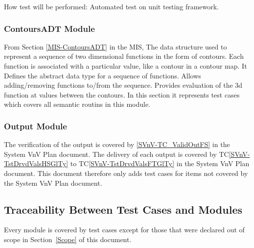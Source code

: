 \documentclass[12pt]{article}
\newcommand{\tcref}[1]{TC\ref{#1}}
\begin{document}
\begin{enumerate}[label=TC\arabic*:,ref={\arabic*}]
How test will be performed: Automated test on unit testing framework.

\subsubsection{ContoursADT Module}	
From Section \ref{MIS-ContoursADT} in the MIS, The data structure used to represent a
sequence of two dimensional functions in the form of contours. Each function
is associated with a particular value, like a contour in a contour map.
It Defines the abstract data type for a sequence of functions.
Allows adding/removing functions to/from the sequence.  Provides evaluation of
the 3d function at values between the contours. In this section it represents test cases which covers all semantic routins in this module.

\subsubsection{Output Module}	

The verification of the output is covered by \ref{SVnV-TC_ValidOutFS} in the 
System VnV Plan document. The delivery of each output is covered by 
\tcref{SVnV-TstDrvdValsHSGlTy} to \tcref{SVnV-TstDrvdValsFTGlTy} in the System VnV Plan 
document. This document therefore only adds test cases for items not covered by 
the System VnV Plan document.


\end{enumerate}

\subsection{Traceability Between Test Cases and Modules}

Every module is covered by test cases except for those that were 
declared out of scope in Section~\ref{Scope} of this document.





\newpage


\end{document}
